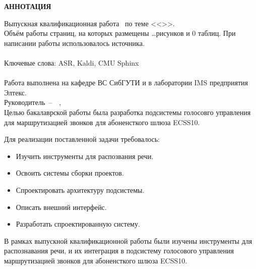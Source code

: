 \begin{center}
    \bf
    АННОТАЦИЯ
\end{center}


\noindent
Выпускная квалификационная работа \fioa\ по теме <<\topicname>>.
\hfill \\
Объём работы \pageref{LastPage} страниц, на которых размещены \dots рисунков
и 0 таблиц. При написании работы использовалось  источника. \\
\hfill \\
Ключевые слова: ASR, Kaldi, CMU Sphinx \\
\hfill \\
Работа выполнена на кафедре ВС СибГУТИ и в лаборатории IMS предприятия Элтекс. \\
Руководитель~--~\theadpos~\thead, \\


Целью бакалаврской работы была разработка подсистемы голосовго управления
для маршрутизацией звонков для абоненсткого шлюза ECSS10.


Для реализации поставленной задачи требовалось:
\begin{itemize}
    \item Изучить инструменты для распозвания речи.
    \item Освоить системы сборки проектов.
    \item Спроектировать архитектуру подсистемы.
    \item Описать внешний интерфейс.
    \item Разработать спроектированную систему.
\end{itemize}


В рамках выпускной квалификационной работы были изучены инструменты для
распознавания речи, и их интеграция в подсистему голосового управления
маршрутизацией звонков для абоненсткого шлюза ECSS10.


\thispagestyle{empty}
